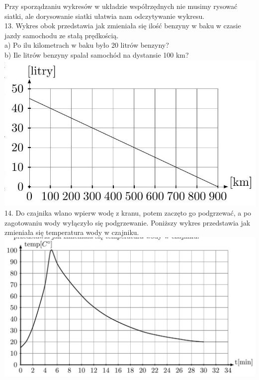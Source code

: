 \documentclass[10pt]{article}
\begin{document}
Przy sporządzaniu wykresów w układzie współrzędnych nie musimy rysować siatki, ale dorysowanie siatki ułatwia nam odczytywanie wykresu.\\
13. Wykres obok przedstawia jak zmieniała się ilość benzyny w baku w czasie jazdy samochodu ze stałą prędkością.\\
a) Po ilu kilometrach w baku było 20 litrów benzyny?\\
b) Ile litrów benzyny spalał samochód na dystansie 100 km?\\
\includegraphics[max width=\textwidth, center]{2024_11_21_8f01584889ff06348ae7g-072(1)}\\
14. Do czajnika wlano wpierw wodę z kranu, potem zaczęto go podgrzewać, a po zagotowaniu wody wyłączyło się podgrzewanie. Poniższy wykres przedstawia jak zmieniała się temperatura wody w czajniku.\\
\includegraphics[max width=\textwidth, center]{2024_11_21_8f01584889ff06348ae7g-073(1)}
\end{document}
